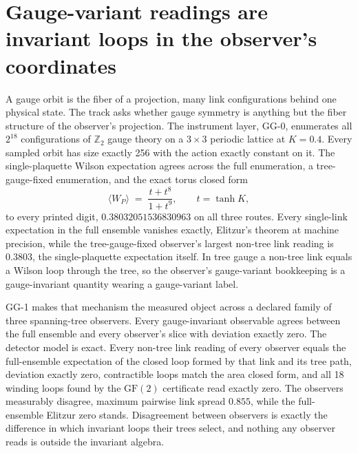 \documentclass[aps,pre,reprint,nofootinbib,floatfix]{revtex4-2}
\begin{document}
\section{Gauge-variant readings are invariant loops in the
observer's coordinates}
\label{sec:gg}

A gauge orbit is the fiber of a projection, many link
configurations behind one physical state.  The track asks whether
gauge symmetry is anything but the fiber structure of the
observer's projection.  The instrument layer, GG-0, enumerates all
$2^{18}$ configurations of $\mathbb{Z}_2$ gauge theory
\cite{Wegner1971} on a $3\times3$ periodic lattice at $K=0.4$.
Every sampled orbit has size exactly 256 with the action exactly
constant on it.  The single-plaquette Wilson expectation agrees
across the full enumeration, a tree-gauge-fixed enumeration, and
the exact torus closed form
\begin{equation}
  \langle W_P \rangle \;=\; \frac{t + t^{8}}{1 + t^{9}},
  \qquad t = \tanh K,
  \label{eq:wilson}
\end{equation}
to every printed digit, $0.38032051536830963$ on all three routes.
Every single-link expectation in the full ensemble vanishes
exactly, Elitzur's theorem \cite{Elitzur1975} at machine precision,
while the tree-gauge-fixed observer's largest non-tree link
reading is $0.3803$, the single-plaquette expectation itself.  In
tree gauge a non-tree link equals a Wilson loop through the tree,
so the observer's gauge-variant bookkeeping is a gauge-invariant
quantity wearing a gauge-variant label.

GG-1 makes that mechanism the measured object across a declared
family of three spanning-tree observers.  Every gauge-invariant
observable agrees between the full ensemble and every observer's
slice with deviation exactly zero.  The detector model is exact.
Every non-tree link reading of every observer equals the
full-ensemble expectation of the closed loop formed by that link
and its tree path, deviation exactly zero, contractible loops match
the area closed form, and all 18 winding loops found by the
$\mathrm{GF}(2)$ certificate read exactly zero.  The observers
measurably disagree, maximum pairwise link spread $0.855$, while
the full-ensemble Elitzur zero stands.  Disagreement between
observers is exactly the difference in which invariant loops their
trees select, and nothing any observer reads is outside the
invariant algebra.
\end{document}
